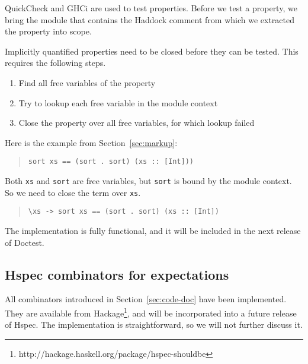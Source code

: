 \documentclass[preprint]{sigplanconf}
\begin{document}
\noindent QuickCheck and GHCi are used to test properties.  Before we
test a property, we bring the module that contains the Haddock comment
from which we extracted the property into scope.

Implicitly quantified properties need to be closed before they can be
tested.  This requires the following steps.
\begin{enumerate}
    \item
        Find all free variables of the property
    \item
        Try to lookup each free variable in the module context
    \item
        Close the property over all free variables, for which lookup
        failed
\end{enumerate}

\noindent Here is the example from Section~\ref{sec:markup}:

\begin{quote}
\small
\begin{verbatim}
sort xs == (sort . sort) (xs :: [Int]))
\end{verbatim}
\end{quote}

\noindent Both \verb|xs| and \verb|sort| are free variables, but
\verb|sort| is bound by the module context.  So we need to close the
term over \verb|xs|.

\begin{quote}
\small
\begin{verbatim}
\xs -> sort xs == (sort . sort) (xs :: [Int])
\end{verbatim}
\end{quote}

The implementation is fully functional, and it will be included in the
next release of Doctest.


\subsection{Hspec combinators for expectations}
\label{sec:hspec-comb}

\noindent All combinators introduced in Section~\ref{sec:code-doc} have been
implemented.  They are available from Hackage\footnote{%
http://hackage.haskell.org/package/hspec-shouldbe},
and will be incorporated into a future
release of Hspec.
The implementation is straightforward, so we will not further discuss
it.
\end{document}

